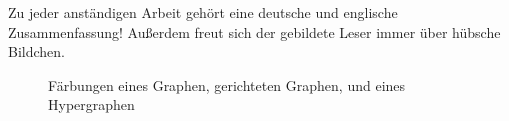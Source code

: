 Zu jeder anständigen Arbeit gehört eine deutsche und englische Zusammenfassung! Außerdem freut sich der gebildete Leser immer über hübsche Bildchen.



\begin{figure}[htp!]
\centering
\resizebox{.7\linewidth}{!}{

}
\caption*{Färbungen eines Graphen, gerichteten Graphen, und eines Hypergraphen}
\end{figure}